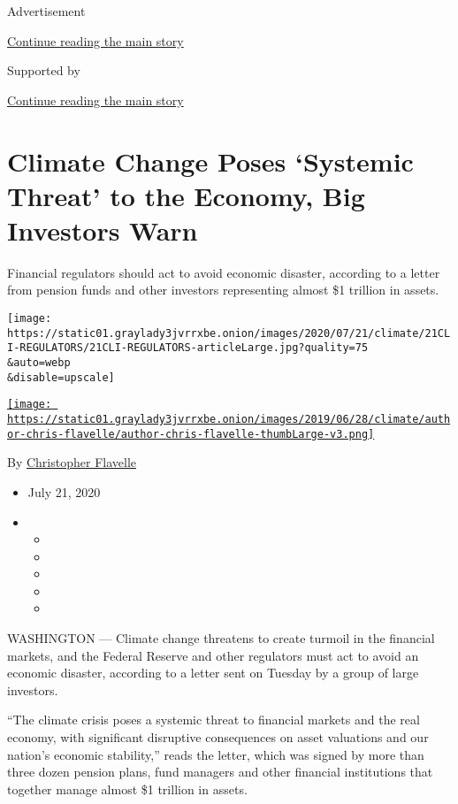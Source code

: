 Advertisement

\protect\hyperlink{after-top}{Continue reading the main story}

Supported by

\protect\hyperlink{after-sponsor}{Continue reading the main story}

\hypertarget{climate-change-poses-systemic-threat-to-the-economy-big-investors-warn}{%
\section{Climate Change Poses `Systemic Threat' to the Economy, Big
Investors
Warn}\label{climate-change-poses-systemic-threat-to-the-economy-big-investors-warn}}

Financial regulators should act to avoid economic disaster, according to
a letter from pension funds and other investors representing almost \$1
trillion in assets.

\texttt{[image: https://static01.graylady3jvrrxbe.onion/images/2020/07/21/climate/21CLI-REGULATORS/21CLI-REGULATORS-articleLarge.jpg?quality=75\\\&auto=webp\\\&disable=upscale]}

\href{https://www.nytimes3xbfgragh.onion/by/christopher-flavelle}{\texttt{[image: https://static01.graylady3jvrrxbe.onion/images/2019/06/28/climate/author-chris-flavelle/author-chris-flavelle-thumbLarge-v3.png]}}

By
\href{https://www.nytimes3xbfgragh.onion/by/christopher-flavelle}{Christopher
Flavelle}

\begin{itemize}
\item
  July 21, 2020
\item
  \begin{itemize}
  \item
  \item
  \item
  \item
  \item
  \end{itemize}
\end{itemize}

WASHINGTON --- Climate change threatens to create turmoil in the
financial markets, and the Federal Reserve and other regulators must act
to avoid an economic disaster, according to a letter sent on Tuesday by
a group of large investors.

``The climate crisis poses a systemic threat to financial markets and
the real economy, with significant disruptive consequences on asset
valuations and our nation's economic stability,'' reads the letter,
which was signed by more than three dozen pension plans, fund managers
and other financial institutions that together manage almost \$1
trillion in assets.

